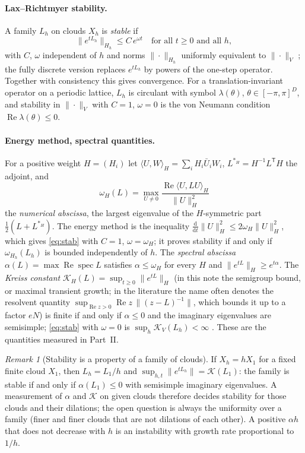 \documentclass[11pt,a4paper]{article}
\theoremstyle{plain}
\theoremstyle{definition}
\theoremstyle{remark}
\newtheorem{remark}[theorem]{Remark}
\numberwithin{equation}{section}
\newcommand{\dd}{\mathrm{d}}
\renewcommand{\Re}{\operatorname{Re}}
\newcommand{\spec}{\operatorname{spec}}
\begin{document}
\paragraph{Lax--Richtmyer stability.} A family $L_h$ on clouds $X_h$ is \emph{stable} if
\begin{equation}\label{eq:stab}
\|e^{tL_h}\|_{H_h}\le C\,e^{\omega t}\quad\text{for all }t\ge0\text{ and all }h,
\end{equation}
with $C$, $\omega$ independent of $h$ and norms $\|\cdot\|_{H_h}$ uniformly equivalent to $\|\cdot\|_V$ \cite{GKO2013}; the fully discrete version replaces $e^{tL_h}$ by powers of the one-step operator. Together with consistency this gives convergence. For a translation-invariant operator on a periodic lattice, $L_h$ is circulant with symbol $\lambda(\theta)$, $\theta\in[-\pi,\pi]^D$, and stability in $\|\cdot\|_V$ with $C=1$, $\omega=0$ is the von Neumann condition $\Re\lambda(\theta)\le0$.

\paragraph{Energy method, spectral quantities.} For a positive weight $H=(H_i)$ let $\langle U,W\rangle_H=\sum_iH_i\bar U_iW_i$, $L^{*_H}=H^{-1}L^{\mathsf T}H$ the adjoint, and
\begin{equation}\label{eq:numabs}
\omega_H(L)=\max_{U\ne0}\frac{\Re\langle U,LU\rangle_H}{\|U\|_H^2}
\end{equation}
the \emph{numerical abscissa}, the largest eigenvalue of the $H$-symmetric part $\tfrac12(L+L^{*_H})$. The energy method is the inequality $\frac{\dd}{\dd t}\|U\|_H^2\le2\omega_H\|U\|_H^2$, which gives \eqref{eq:stab} with $C=1$, $\omega=\omega_H$; it proves stability if and only if $\omega_{H_h}(L_h)$ is bounded independently of $h$. The \emph{spectral abscissa} $\alpha(L)=\max\Re\spec L$ satisfies $\alpha\le\omega_H$ for every $H$ and $\|e^{tL}\|_H\ge e^{t\alpha}$. The \emph{Kreiss constant} $\mathcal K_H(L)=\sup_{t\ge0}\|e^{tL}\|_H$ (in this note the semigroup bound, or maximal transient growth; in the literature the name often denotes the resolvent quantity $\sup_{\Re z>0}\Re z\,\|(z-L)^{-1}\|$, which bounds it up to a factor $eN$) is finite if and only if $\alpha\le0$ and the imaginary eigenvalues are semisimple; \eqref{eq:stab} with $\omega=0$ is $\sup_h\mathcal K_{V}(L_h)<\infty$ \cite{TrefethenEmbree2005}. These are the quantities measured in Part~II.

\begin{remark}[Stability is a property of a family of clouds]\label{rem:dilation}
If $X_h=hX_1$ for a fixed finite cloud $X_1$, then $L_h=L_1/h$ and $\sup_{h,t}\|e^{tL_h}\|=\mathcal K(L_1)$: the family is stable if and only if $\alpha(L_1)\le0$ with semisimple imaginary eigenvalues. A measurement of $\alpha$ and $\mathcal K$ on given clouds therefore decides stability for those clouds and their dilations; the open question is always the uniformity over a family (finer and finer clouds that are not dilations of each other). A positive $\alpha h$ that does not decrease with $h$ is an instability with growth rate proportional to $1/h$.
\end{remark}
\end{document}
